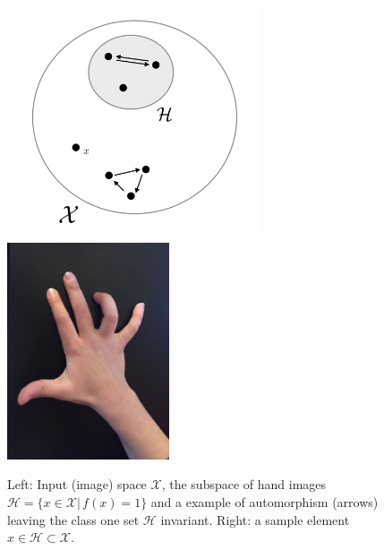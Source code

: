 \documentclass[11pt]{amsart}
\newcommand{\inputspace}{\mathcal X}
\newcommand{\handspace}{\mathcal H}
\begin{document}
%
%
\begin{figure}[t!]
\centering
\includegraphics[width=7.5cm]{figures/fig1}\includegraphics[width=4.8cm]{figures/hand}
\caption{Left: Input (image) space $\inputspace$, the subspace of hand images $ \handspace =\{ x \in \inputspace  | \, f(x)=1 \}$ and a example of  automorphism (arrows) leaving the class one set $ \handspace$ invariant.  Right: a sample element $x\in \handspace \subset \inputspace$. \label{fig1}}
\end{figure}
\end{document}
